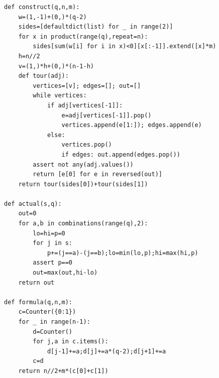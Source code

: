 \documentclass[11pt]{article}
\begin{document}
{\begin{verbatim}
def construct(q,n,m):
    w=(1,-1)+(0,)*(q-2)
    sides=[defaultdict(list) for _ in range(2)]
    for x in product(range(q),repeat=n):
        sides[sum(w[i] for i in x)<0][x[:-1]].extend([x]*m)
    h=n//2
    v=(1,)*h+(0,)*(n-1-h)
    def tour(adj):
        vertices=[v]; edges=[]; out=[]
        while vertices:
            if adj[vertices[-1]]:
                e=adj[vertices[-1]].pop()
                vertices.append(e[1:]); edges.append(e)
            else:
                vertices.pop()
                if edges: out.append(edges.pop())
        assert not any(adj.values())
        return [e[0] for e in reversed(out)]
    return tour(sides[0])+tour(sides[1])

def actual(s,q):
    out=0
    for a,b in combinations(range(q),2):
        lo=hi=p=0
        for j in s:
            p+=(j==a)-(j==b);lo=min(lo,p);hi=max(hi,p)
        assert p==0
        out=max(out,hi-lo)
    return out

def formula(q,n,m):
    c=Counter({0:1})
    for _ in range(n-1):
        d=Counter()
        for j,a in c.items():
            d[j-1]+=a;d[j]+=a*(q-2);d[j+1]+=a
        c=d
    return n//2+m*(c[0]+c[1])


\end{verbatim}}
\end{document}
